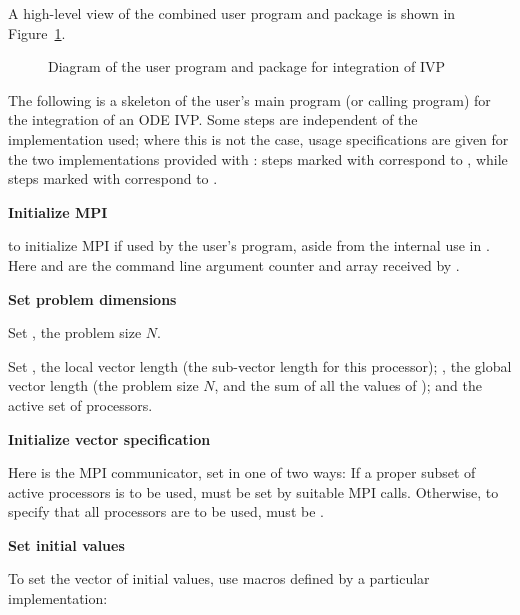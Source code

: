 A high-level view of the combined user program and {\cvode} package is
shown in Figure~\ref{f:sim_overview}.
\begin{figure}
\centerline{}
\caption {Diagram of the user program and 
  {\cvode} package for integration of IVP}\label{f:sim_overview}
\end{figure}
The following is a skeleton of the user's main program (or calling
program) for the integration of an ODE IVP. Some steps are independent of the {\nvector}
implementation used; where this is not the case, usage specifications are given for the
two implementations provided with {\cvode}: steps marked with {\p} correspond to 
{\nvecp}, while steps marked with {\s} correspond to {\nvecs}.
\begin{Steps}
  
\item 
  {\bf {\p} Initialize MPI}

   to initialize MPI if used by
  the user's program, aside from the internal use in {\nvecp}.  
  Here  and  are the command line argument 
  counter and array received by .
  
\item
  {\bf Set problem dimensions}

  {\s} Set , the problem size $N$.

  {\p} Set , the local vector length (the sub-vector
  length for this processor); , the global vector length (the
  problem size $N$, and the sum of all the values of );
  and the active set of processors.
  
\item\label{i:nv_spec_init}
  {\bf Initialize vector specification}

  {\s} 

  {\p} 
  Here  is the MPI communicator, set in one of two ways: 
  If a proper subset of active processors is to be used,  
  must be set by suitable MPI calls. Otherwise, to specify that all 
  processors are to be used,  must be .
  
\item
  {\bf Set initial values}
 
  To set the vector  of initial values, use macros defined by a particular 
  {\nvector} implementation:


\end{Steps}
